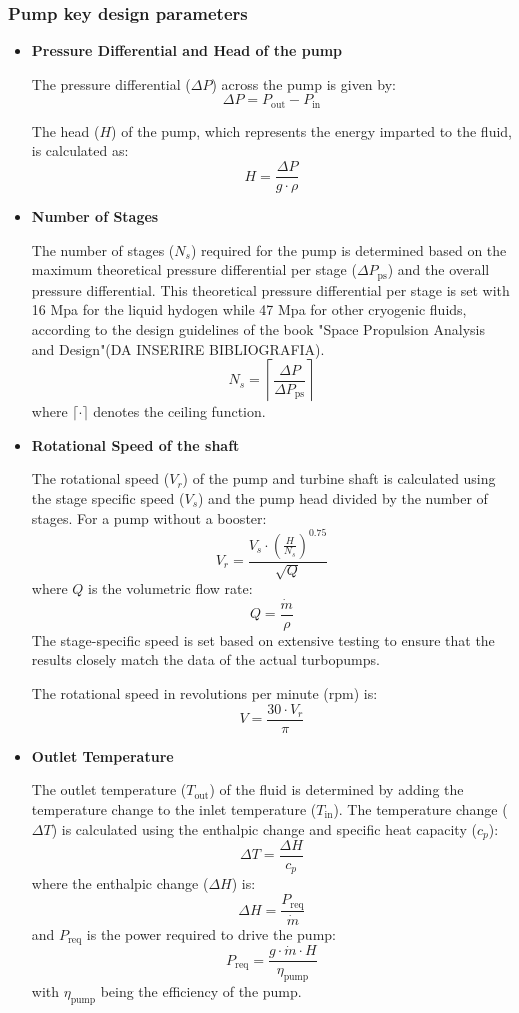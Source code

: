 \subsubsection{Pump key design parameters}
\begin{itemize}
    
 \item\textbf{Pressure Differential and Head of the pump}

The pressure differential (\(\Delta P\)) across the pump is given by:
\[
\Delta P = P_{\text{out}} - P_{\text{in}}
\]

The head (\(H\)) of the pump, which represents the energy imparted to the fluid, is calculated as:
\[
H = \frac{\Delta P}{g \cdot \rho}
\]

\item\textbf{Number of Stages}

The number of stages (\(N_s\)) required for the pump is determined based on the maximum theoretical pressure differential per stage (\(\Delta P_{\text{ps}}\)) and the overall pressure differential.
This theoretical pressure differential per stage is set with 16 Mpa for the liquid hydogen while 47 Mpa for other cryogenic fluids, according to the design guidelines of the book "Space Propulsion Analysis and Design"(DA INSERIRE BIBLIOGRAFIA).
\[
N_s = \left\lceil \frac{\Delta P}{\Delta P_{\text{ps}}} \right\rceil
\]
where \(\lceil \cdot \rceil\) denotes the ceiling function.

\item\textbf{Rotational Speed of the shaft}

The rotational speed (\(V_r\)) of the pump and turbine shaft is calculated using the stage specific speed (\(V_s\)) and the pump head divided by the number of stages. For a pump without a booster:
\[
V_r = \frac{V_s \cdot \left(\frac{H}{N_s}\right)^{0.75}}{\sqrt{Q}}
\]
where \(Q\) is the volumetric flow rate:
\[
Q = \frac{\dot{m}}{\rho}
\]
The stage-specific speed is set based on extensive testing to ensure that the results closely match the data of the actual turbopumps.

The rotational speed in revolutions per minute (rpm) is:
\[
V = \frac{30 \cdot V_r}{\pi}
\]

\item\textbf{Outlet Temperature}

The outlet temperature (\(T_{\text{out}}\)) of the fluid is determined by adding the temperature change to the inlet temperature (\(T_{\text{in}}\)). The temperature change (\(\Delta T\)) is calculated using the enthalpic change and specific heat capacity (\(c_p\)):
\[
\Delta T = \frac{\Delta H}{c_p}
\]
where the enthalpic change (\(\Delta H\)) is:
\[
\Delta H = \frac{P_{\text{req}}}{\dot{m}}
\]
and \(P_{\text{req}}\) is the power required to drive the pump:
\[
P_{\text{req}} = \frac{g \cdot \dot{m} \cdot H}{\eta_{\text{pump}}}
\]
with \(\eta_{\text{pump}}\) being the efficiency of the pump.


\end{itemize}
